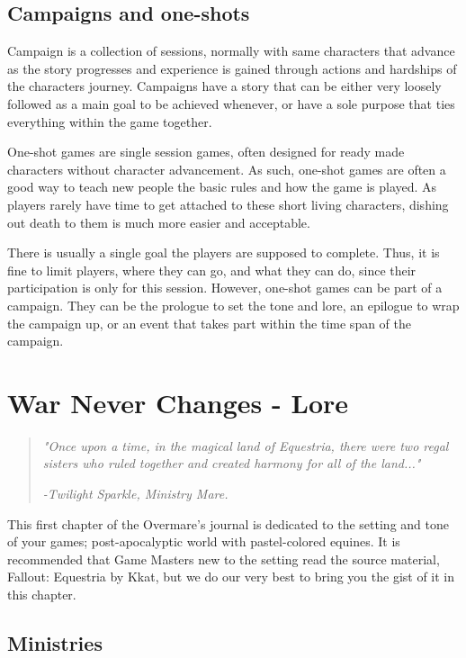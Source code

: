 \documentclass[11pt,a4paper,twocolumn]{book}
\begin{document}
     \section*{Campaigns and one-shots}
    Campaign is a collection of sessions, normally with same characters that advance as the story progresses and experience is gained through actions and hardships of the characters journey. Campaigns have a story that can be either very loosely followed as a main goal to be achieved whenever, or have a sole purpose that ties everything within the game together.
    
    One-shot games are single session games, often designed for ready made characters without character advancement. As such, one-shot games are often a good way to teach new people the basic rules and how the game is played. As players rarely have time to get attached to these short living characters, dishing out death to them is much more easier and acceptable. 
    
    There is usually a single goal the players are supposed  to complete. Thus, it is fine to limit players, where they can go, and what they can do, since their participation is only for this session. However, one-shot games can be part of a campaign. They can be the prologue to set the tone and lore, an epilogue to wrap the campaign up, or an event that takes part within the time span of the campaign.
    
    \chapter{War Never Changes - Lore}
    
    \begin{quote}
    \emph{"Once upon a time, in the magical land of Equestria, there were two regal sisters who ruled together and created harmony for all of the land..."}
    
    \emph{-Twilight Sparkle, Ministry Mare.}
    
    \end{quote}
    
    This first chapter of the Overmare's journal is dedicated to the setting and tone of your games; post-apocalyptic world with pastel-colored equines. It is recommended that Game Masters new to the setting read the source material, Fallout: Equestria by Kkat, but we do our very best to bring you the gist of it in this chapter. 
    
    \section*{Ministries}
    
\end{document}
